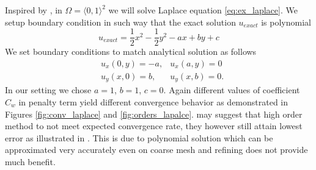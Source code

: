 \begin{example}[Diffusion 2D]
\label{ex:laplace}
Inspired by \cite[cv. 8.4 (3), p. 150]{Holubova2011}, in $\Omega = \langle 0, 1 
\rangle^2$ 
we will solve Laplace equation \eqref{eq:ex_laplace}.
We setup boundary condition in such way that the exact solution 
$u_{exact}$ is polynomial
\begin{equation}
u_{exact} = \frac{1}{2}x^2 - \frac{1}{2}y^2 - ax + by + c
\end{equation}
We set boundary conditions to match analytical solution as follows
\begin{equation}
	\begin{aligned}
		&u_x(0, y) = -a, & u_x(a, y) = 0\\
		&u_y(x, 0) = b, & u_y(x, b) = 0.
	\end{aligned}
\end{equation}
In our setting we chose $a=1$, $b=1$, $c=0$. Again different values of 
coefficient $C_w$ in penalty term yield different convergence behavior as demonstrated in 
Figures \ref{fig:conv_laplace} and \ref{fig:orders_lapalce}.   
may suggest that high order method to not meet expected convergence rate, they however 
still attain lowest error as illustrated in . This is due to 
polynomial solution which can be approximated very accurately even on coarse mesh and 
refining does not provide much benefit.
\end{example}

